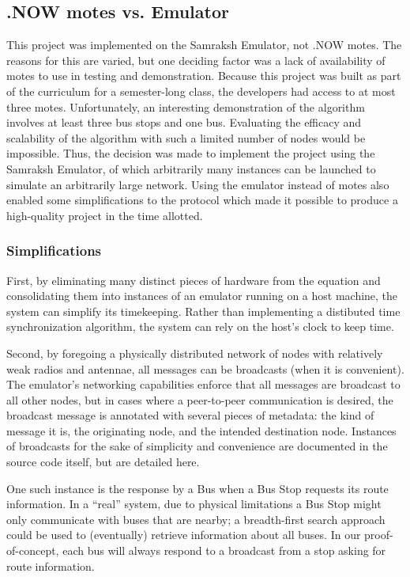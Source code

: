\documentclass[runningheads]{llncs}
\begin{document}
\subsection{.NOW motes vs. Emulator}
This project was implemented on the Samraksh Emulator, not .NOW motes. The reasons for this are varied, but one deciding factor was a lack of availability of motes to use in testing and demonstration. Because this project was built as part of the curriculum for a semester-long class, the developers had access to at most three motes. Unfortunately, an interesting demonstration of the algorithm involves at least three bus stops and one bus. Evaluating the efficacy and scalability of the algorithm with such a limited number of nodes would be impossible. Thus, the decision was made to implement the project using the Samraksh Emulator, of which arbitrarily many instances can be launched to simulate an arbitrarily large network. Using the emulator instead of motes also enabled some simplifications to the protocol which made it possible to produce a high-quality project in the time allotted.

\subsubsection{Simplifications}
First, by eliminating many distinct pieces of hardware from the equation and consolidating them into instances of an emulator running on a host machine, the system can simplify its timekeeping. Rather than implementing a distibuted time synchronization algorithm, the system can rely on the host's clock to keep time.

Second, by foregoing a physically distributed network of nodes with relatively weak radios and antennae, all messages can be broadcasts (when it is convenient). The emulator's networking capabilities enforce that all messages are broadcast to all other nodes, but in cases where a peer-to-peer communication is desired, the broadcast message is annotated with several pieces of metadata: the kind of message it is, the originating node, and the intended destination node. Instances of broadcasts for the sake of simplicity and convenience are documented in the source code itself, but are detailed here.

One such instance is the response by a Bus when a Bus Stop requests its route information. In a ``real'' system, due to physical limitations a Bus Stop might only communicate with buses that are nearby; a breadth-first search approach could be used to (eventually) retrieve information about all buses. In our proof-of-concept, each bus will always respond to a broadcast from a stop asking for route information.
\end{document}

